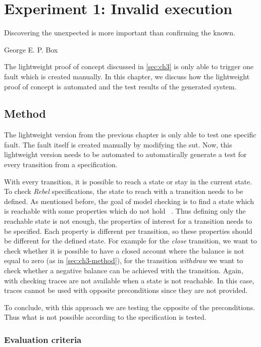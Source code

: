 \chapter{Experiment 1: Invalid execution}\label{sec:ch4}

\epigraph{Discovering the unexpected is more important than confirming the
known.}{George E. P. Box}

The lightweight proof of concept discussed in \autoref{sec:ch3} is only able
to trigger one fault which is created manually. In this chapter, we discuss how
the lightweight proof of concept is automated and the test results of the
generated system.

\section{Method}

The lightweight version from the previous chapter is only able to test one specific
fault. The fault itself is created manually by modifying the \gls{sut}. Now,
this lightweight version needs to be automated to automatically generate a test
for every transition from a specification.

With every transition, it is possible to reach a state or stay in the current
state. To check \textit{Rebel} specifications, the state to reach with a transition needs
to be defined. As mentioned before, the goal of model checking is to find a
state which is reachable with some properties which do not hold
~\cite[p.~5]{stoel_storm_vinju_bosman_2016}. Thus defining only the reachable
state is not enough, the properties of interest for a transition needs to be
specified. Each property is different per transition, so these properties should
be different for the defined state. For example for the \textit{close}
transition, we want to check whether it is possible to have a closed account
where the balance is not equal to zero (as in \autoref{sec:ch3-method}),
for the transition \textit{withdraw} we want to check whether a negative balance
can be achieved with the transition. Again, with checking traces are not
available when a state is not reachable. In this case, traces cannot be used
with opposite preconditions since they are not provided.

To conclude, with this approach we are testing the opposite of the preconditions.
Thus what is not possible according to the specification is tested.

\subsection{Evaluation criteria}\label{sec:ch4-eval-criteria}

